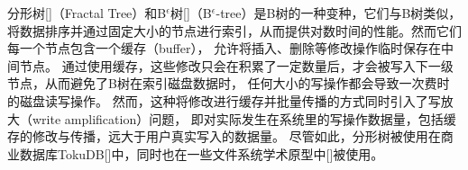 分形树[]（Fractal Tree）和B$^\epsilon$树[]（B$^\epsilon$-tree）是B树的一种变种，它们与B树类似，
将数据排序并通过固定大小的节点进行索引，从而提供对数时间的性能。然而它们每一个节点包含一个缓存（buffer），
允许将插入、删除等修改操作临时保存在中间节点。
通过使用缓存，这些修改只会在积累了一定数量后，才会被写入下一级节点，从而避免了B树在索引磁盘数据时，
任何大小的写操作都会导致一次费时的磁盘读写操作。
然而，这种将修改进行缓存并批量传播的方式同时引入了写放大（write amplification）问题，
即对实际发生在系统里的写操作数据量，包括缓存的修改与传播，远大于用户真实写入的数据量。
尽管如此，分形树被使用在商业数据库TokuDB[]中，同时也在一些文件系统学术原型中[]被使用。



